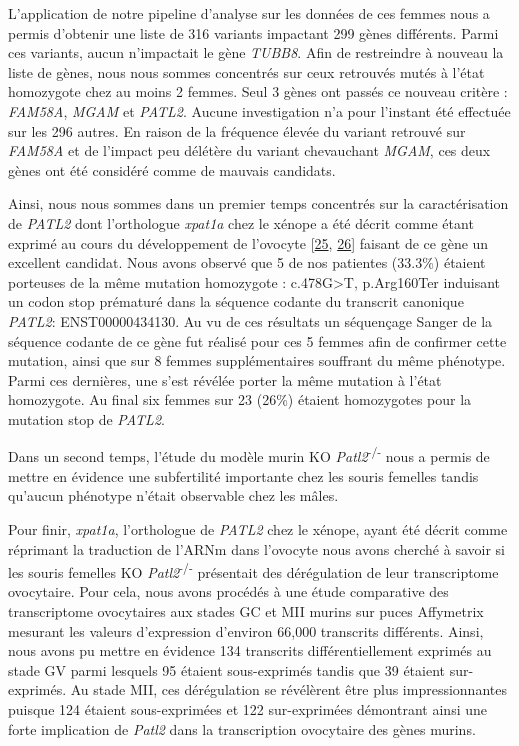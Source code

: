 \documentclass[12pt,twoside]{ugathesis}
\begin{document}
L'application de notre pipeline d'analyse sur les données de ces femmes
nous a permis d'obtenir une liste de 316 variants impactant 299 gènes
différents. Parmi ces variants, aucun n'impactait le gène \emph{TUBB8}.
Afin de restreindre à nouveau la liste de gènes, nous nous sommes
concentrés sur ceux retrouvés mutés à l'état homozygote chez au moins 2
femmes. Seul 3 gènes ont passés ce nouveau critère : \emph{FAM58A},
\emph{MGAM} et \emph{PATL2}. Aucune investigation n'a pour l'instant été
effectuée sur les 296 autres. En raison de la fréquence élevée du
variant retrouvé sur \emph{FAM58A} et de l'impact peu délétère du
variant chevauchant \emph{MGAM}, ces deux gènes ont été considéré comme
de mauvais candidats.

Ainsi, nous nous sommes dans un premier temps concentrés sur la
caractérisation de \emph{PATL2} dont l'orthologue \emph{xpat1a} chez le
xénope a été décrit comme étant exprimé au cours du développement de
l'ovocyte {[}\protect\hyperlink{ref-Marnef2010}{25},
\protect\hyperlink{ref-Nakamura2010}{26}{]} faisant de ce gène un
excellent candidat. Nous avons observé que 5 de nos patientes (33.3\%)
étaient porteuses de la même mutation homozygote :
c.478G\textgreater{}T, p.Arg160Ter induisant un codon stop prématuré
dans la séquence codante du transcrit canonique \emph{PATL2}:
ENST00000434130. Au vu de ces résultats un séquençage Sanger de la
séquence codante de ce gène fut réalisé pour ces 5 femmes afin de
confirmer cette mutation, ainsi que sur 8 femmes supplémentaires
souffrant du même phénotype. Parmi ces dernières, une s'est révélée
porter la même mutation à l'état homozygote. Au final six femmes sur 23
(26\%) étaient homozygotes pour la mutation stop de \emph{PATL2}.

Dans un second temps, l'étude du modèle murin KO
\emph{Patl2}\textsuperscript{-/-} nous a permis de mettre en évidence
une subfertilité importante chez les souris femelles tandis qu'aucun
phénotype n'était observable chez les mâles.

Pour finir, \emph{xpat1a}, l'orthologue de \emph{PATL2} chez le xénope,
ayant été décrit comme réprimant la traduction de l'ARNm dans l'ovocyte
nous avons cherché à savoir si les souris femelles KO
\emph{Patl2}\textsuperscript{-/-} présentait des dérégulation de leur
transcriptome ovocytaire. Pour cela, nous avons procédés à une étude
comparative des transcriptome ovocytaires aux stades GC et MII murins
sur puces Affymetrix mesurant les valeurs d'expression d'environ 66,000
transcrits différents. Ainsi, nous avons pu mettre en évidence 134
transcrits différentiellement exprimés au stade GV parmi lesquels 95
étaient sous-exprimés tandis que 39 étaient sur-exprimés. Au stade MII,
ces dérégulation se révélèrent être plus impressionnantes puisque 124
étaient sous-exprimées et 122 sur-exprimées démontrant ainsi une forte
implication de \emph{Patl2} dans la transcription ovocytaire des gènes
murins.
\end{document}
